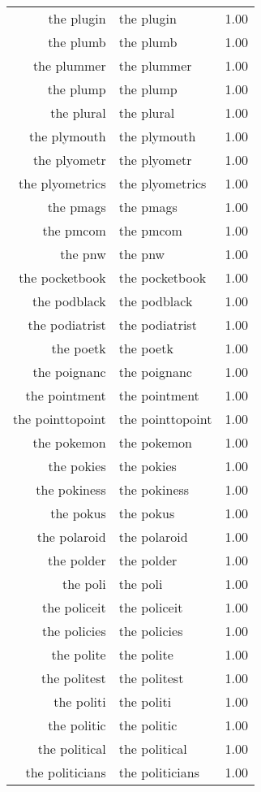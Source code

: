 \begin{table}[ht]
\begin{tabular}{rlr}
  the plugin & the plugin & 1.00 \\ 
  the plumb & the plumb & 1.00 \\ 
  the plummer & the plummer & 1.00 \\ 
  the plump & the plump & 1.00 \\ 
  the plural & the plural & 1.00 \\ 
  the plymouth & the plymouth & 1.00 \\ 
  the plyometr & the plyometr & 1.00 \\ 
  the plyometrics & the plyometrics & 1.00 \\ 
  the pmags & the pmags & 1.00 \\ 
  the pmcom & the pmcom & 1.00 \\ 
  the pnw & the pnw & 1.00 \\ 
  the pocketbook & the pocketbook & 1.00 \\ 
  the podblack & the podblack & 1.00 \\ 
  the podiatrist & the podiatrist & 1.00 \\ 
  the poetk & the poetk & 1.00 \\ 
  the poignanc & the poignanc & 1.00 \\ 
  the pointment & the pointment & 1.00 \\ 
  the pointtopoint & the pointtopoint & 1.00 \\ 
  the pokemon & the pokemon & 1.00 \\ 
  the pokies & the pokies & 1.00 \\ 
  the pokiness & the pokiness & 1.00 \\ 
  the pokus & the pokus & 1.00 \\ 
  the polaroid & the polaroid & 1.00 \\ 
  the polder & the polder & 1.00 \\ 
  the poli & the poli & 1.00 \\ 
  the policeit & the policeit & 1.00 \\ 
  the policies & the policies & 1.00 \\ 
  the polite & the polite & 1.00 \\ 
  the politest & the politest & 1.00 \\ 
  the politi & the politi & 1.00 \\ 
  the politic & the politic & 1.00 \\ 
  the political & the political & 1.00 \\ 
  the politicians & the politicians & 1.00 \\ 

\end{tabular}
\end{table}
